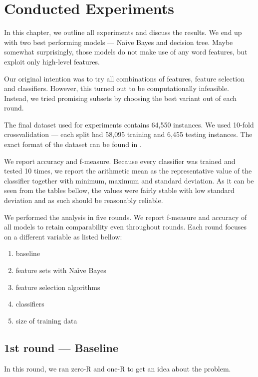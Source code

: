 \chapter{Conducted Experiments}\label{chap:exp}


In this chapter, we outline all experiments and discuss the results.
We end up with two best performing models --- Na\"{\i}ve Bayes and decision tree.
Maybe somewhat surprisingly, those models do not make use of any word features,
but exploit only high-level features.

Our original intention was to try all combinations of features, feature selection and classifiers.
However, this turned out to be computationally infeasible.
Instead, we tried promising subsets by choosing the best variant out of each round.

The final dataset used for experiments contains  64,550 instances.
We used 10-fold crossvalidation --- each split had
58,095 training and 6,455 testing instances.
The exact format of the dataset can be found in .

We report accuracy and f-measure.
Because every classifier was trained and tested 10 times,
we report the arithmetic mean as the representative value of the classifier
together with minimum, maximum and standard deviation.
As it can be seen from the tables bellow, 
the values were fairly stable with low standard deviation and
as such should be reasonably reliable.

We performed the analysis in five rounds.
We report f-measure and accuracy of all models to retain comparability even throughout rounds.
Each round focuses on a different variable as listed bellow:

\begin{enumerate}
	\item baseline
	\item feature sets with Na\"{\i}ve Bayes
	\item feature selection algorithms
	\item classifiers
	\item size of training data
\end{enumerate}


\section{1st round --- Baseline}

In this round, we ran zero-R and one-R to get an idea about the problem.

